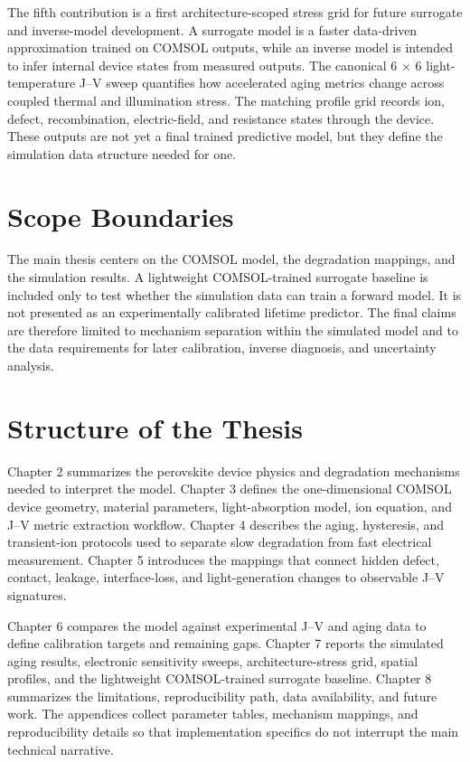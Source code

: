 The fifth contribution is a first architecture-scoped stress grid for future
surrogate and inverse-model development. A surrogate model is a faster
data-driven approximation trained on COMSOL outputs, while an inverse model is
intended to infer internal device states from measured outputs. The canonical
6 $\times$ 6
light-temperature J--V sweep quantifies how accelerated aging metrics change
across coupled thermal and illumination stress. The matching profile grid
records ion, defect, recombination, electric-field, and resistance states
through the device. These outputs are not yet a final trained predictive
model, but they define the simulation data structure needed for one.

\section{Scope Boundaries}

The main thesis centers on the COMSOL model, the degradation mappings, and the
simulation results. A lightweight COMSOL-trained surrogate baseline is included
only to test whether the simulation data can train a forward model. It is not
presented as an experimentally calibrated lifetime predictor. The final claims
are therefore limited to mechanism separation within the simulated model and
to the data requirements for later calibration, inverse diagnosis, and
uncertainty analysis.

\section{Structure of the Thesis}

Chapter 2 summarizes the perovskite device physics and degradation mechanisms
needed to interpret the model. Chapter 3 defines the one-dimensional COMSOL
device geometry, material parameters, light-absorption model, ion equation, and
J--V metric extraction workflow. Chapter 4 describes the aging, hysteresis, and
transient-ion protocols used to separate slow degradation from fast electrical
measurement. Chapter 5 introduces the mappings that connect hidden defect,
contact, leakage, interface-loss, and light-generation changes to
observable J--V signatures.

Chapter 6 compares the model against experimental J--V and aging data to define
calibration targets and remaining gaps. Chapter 7 reports the simulated aging
results, electronic sensitivity sweeps, architecture-stress grid, spatial
profiles, and the lightweight COMSOL-trained surrogate baseline. Chapter 8
summarizes the limitations, reproducibility path, data availability, and future
work. The appendices collect parameter tables, mechanism mappings, and
reproducibility details so that implementation specifics do not interrupt the
main technical narrative.
